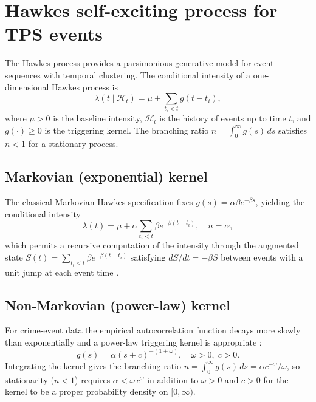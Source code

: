 \documentclass[article,shortnames,nojss]{jss}
\begin{document}
\section{Hawkes self-exciting process for TPS events}
\label{sec:hawkes}

The Hawkes process \citep{Hawkes1971, Ogata1981} provides a
parsimonious generative model for event sequences with temporal
clustering. The conditional intensity of a one-dimensional Hawkes
process is
\begin{equation}
\label{eq:hawkes-1d}
\lambda(t \mid \mathcal{H}_t) = \mu +
\sum_{t_i < t} g(t - t_i),
\end{equation}
where $\mu > 0$ is the baseline intensity, $\mathcal{H}_t$ is the
history of events up to time $t$, and $g(\cdot) \ge 0$ is the
triggering kernel. The branching ratio $n = \int_0^\infty g(s)\,ds$
satisfies $n < 1$ for a stationary process.

\subsection{Markovian (exponential) kernel}

The classical Markovian Hawkes specification fixes
$g(s) = \alpha \beta e^{-\beta s}$, yielding the conditional
intensity
\begin{equation}
\lambda(t) = \mu + \alpha \sum_{t_i < t} \beta e^{-\beta (t - t_i)},
\quad n = \alpha,
\end{equation}
which permits a recursive computation of the intensity through the
augmented state $S(t) = \sum_{t_i < t} \beta e^{-\beta(t-t_i)}$
satisfying $dS/dt = -\beta S$ between events with a unit jump at
each event time \citep{Ogata1981, Daley2003}.

\subsection{Non-Markovian (power-law) kernel}

For crime-event data the empirical autocorrelation function decays
more slowly than exponentially and a power-law triggering kernel
is appropriate \citep{Mohler2011}:
\begin{equation}
g(s) = \alpha (s + c)^{-(1 + \omega)},
\quad
\omega > 0, \; c > 0.
\end{equation}
Integrating the kernel gives the branching ratio
$n = \int_0^\infty g(s)\,ds = \alpha c^{-\omega}/\omega$, so
stationarity ($n<1$) requires $\alpha < \omega\, c^{\omega}$ in
addition to $\omega>0$ and $c>0$ for the kernel to be a proper
probability density on $[0,\infty)$.
\end{document}
